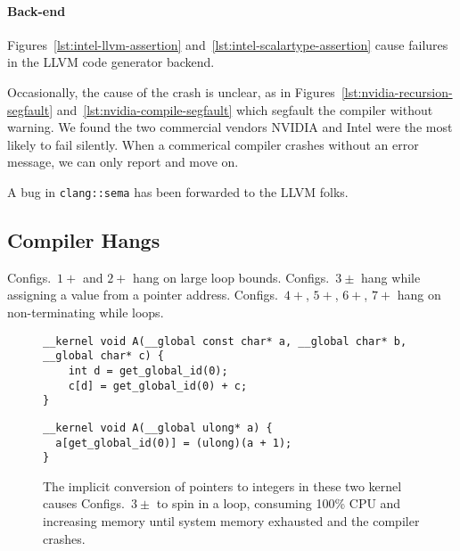 \paragraph{Back-end} Figures~\ref{lst:intel-llvm-assertion} and~\ref{lst:intel-scalartype-assertion} cause failures in the LLVM code generator backend.

Occasionally, the cause of the crash is unclear, as in Figures~\ref{lst:nvidia-recursion-segfault} and~\ref{lst:nvidia-compile-segfault} which segfault the compiler without warning. We found the two commercial vendors NVIDIA and Intel were the most likely to fail silently. When a commerical compiler crashes without an error message, we can only report and move on.

A bug in \texttt{clang::sema} has been forwarded to the LLVM folks.




\subsection{Compiler Hangs}

Configs.\ $1+$ and $2+$ hang on large loop bounds. Configs.\ $3\pm$ hang while assigning a value from a pointer address. Configs.\ $4+$, $5+$, $6+$, $7+$ hang on non-terminating while loops.

\begin{figure}
\begin{lstlisting}
__kernel void A(__global const char* a, __global char* b, __global char* c) {
	int d = get_global_id(0);
	c[d] = get_global_id(0) + c;
}
\end{lstlisting}
\begin{lstlisting}
__kernel void A(__global ulong* a) {
  a[get_global_id(0)] = (ulong)(a + 1);
}
\end{lstlisting}
\caption{The implicit conversion of pointers to integers in these two kernel causes Configs.\ $3\pm$ to spin in a loop, consuming 100\% CPU and increasing memory until system memory exhausted and the compiler crashes.}
\end{figure}

